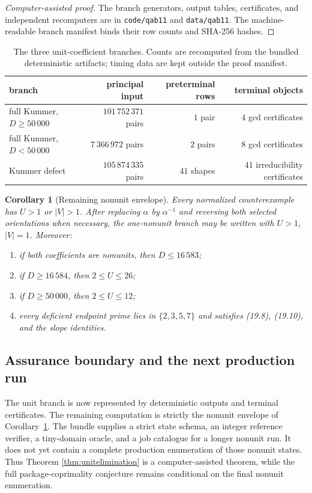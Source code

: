 \documentclass[11pt]{article}
\newtheorem{corollary}[theorem]{Corollary}
\theoremstyle{definition}
\begin{document}
\begin{proof}[Computer-assisted proof]
The branch generators, output tables, certificates, and independent
recomputers are in \texttt{code/qab11} and \texttt{data/qab11}.  The
machine-readable branch manifest binds their row counts and SHA-256 hashes.
\end{proof}

\begin{table}[ht]
\centering
\begin{tabular}{lrrr}
\hline
branch & principal input & preterminal rows & terminal objects\\
\hline
full Kummer, \(D\geq50\,000\) & \(101\,752\,371\) pairs & \(1\) pair & \(4\) gcd certificates\\
full Kummer, \(D<50\,000\) & \(7\,366\,972\) pairs & \(2\) pairs & \(8\) gcd certificates\\
Kummer defect & \(105\,874\,335\) pairs & \(41\) shapes & \(41\) irreducibility certificates\\
\hline
\end{tabular}
\caption{The three unit-coefficient branches.  Counts are recomputed from the
bundled deterministic artifacts; timing data are kept outside the proof
manifest.}
\end{table}

\begin{corollary}[Remaining nonunit envelope]\label{cor:remainingnonunit}
Every normalized counterexample has \(U>1\) or \(|V|>1\).  After replacing
\(\alpha\) by \(\alpha^{-1}\) and reversing both selected orientations when
necessary, the one-nonunit branch may be written with \(U>1\), \(|V|=1\).
Moreover:
\begin{enumerate}[label=(\roman*)]
\item if both coefficients are nonunits, then \(D\leq16\,583\);
\item if \(D\geq16\,584\), then \(2\leq U\leq26\);
\item if \(D\geq50\,000\), then \(2\leq U\leq12\);
\item every deficient endpoint prime lies in \(\{2,3,5,7\}\) and satisfies
(19.8), (19.10), and the slope identities.
\end{enumerate}
\end{corollary}

\subsection{Assurance boundary and the next production run}

The unit branch is now represented by deterministic outputs and terminal
certificates.  The remaining computation is strictly the nonunit envelope of
Corollary~\ref{cor:remainingnonunit}.  The bundle supplies a strict state
schema, an integer reference verifier, a tiny-domain oracle, and a job
catalogue for a longer nonunit run.  It does not yet contain a complete
production enumeration of those nonunit states.  Thus Theorem
\ref{thm:unitelimination} is a computer-assisted theorem, while the full
package-coprimality conjecture remains conditional on the final nonunit
enumeration.
\end{document}
